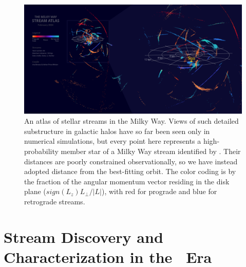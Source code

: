 \documentclass[final,5p,times,twocolumn,authoryear]{elsarticle}
\begin{document}
\begin{figure}[t!]
\begin{center}
\includegraphics[width=1\textwidth]{figures/fos_3d.png}
\end{center}
\caption{%
An atlas of stellar streams in the Milky Way.
Views of such detailed substructure in galactic halos have so far been seen only in numerical simulations, but every point here represents a high-probability member star of a Milky Way stream identified by \citet{ibata:2023, li:2019, vasiliev:2021}.
Their distances are poorly constrained observationally, so we have instead adopted distance from the best-fitting orbit.
The color coding is by the fraction of the angular momentum vector residing in the disk plane ($sign(L_z)L_\perp/|L|$), with red for prograde and blue for retrograde streams.
\label{fig:fos_3d}
}
\end{figure}

\section{Stream Discovery and Characterization in the \gaia\ Era}
\label{sec:discovery}

\end{document}
